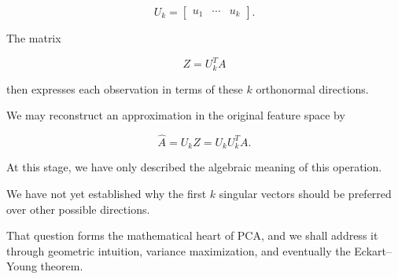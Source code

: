 \documentclass[11pt]{article}
\begin{document}
\[
U_k=
\begin{bmatrix}
u_1 & \cdots & u_k
\end{bmatrix}.
\]

The matrix

\[
\boxed{Z=U_k^TA}
\]

then expresses each observation
in terms of these $k$
orthonormal directions.

We may reconstruct an
approximation in the
original feature space by

\[
\boxed{
\widehat{A}
=
U_kZ
=
U_kU_k^TA.
}
\]

At this stage, we have only
described the algebraic
meaning of this operation.

We have not yet established
why the first $k$ singular
vectors should be preferred
over other possible directions.

That question forms the
mathematical heart of PCA,
and we shall address it
through geometric intuition,
variance maximization, and
eventually the Eckart--Young
theorem.
\end{document}

